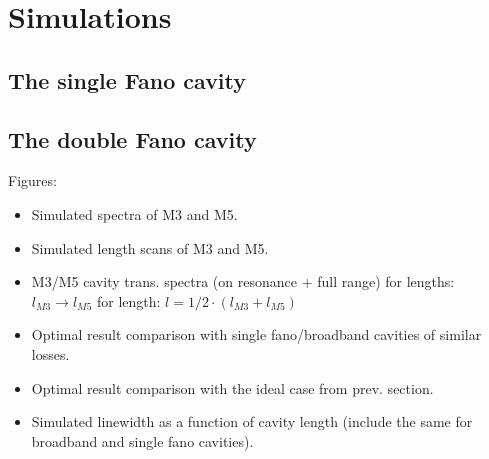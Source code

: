\section{Simulations}

\subsection{The single Fano cavity}

\subsection{The double Fano cavity}

Figures:
\begin{itemize}
    \item Simulated spectra of M3 and M5.
    \item Simulated length scans of M3 and M5.
    \item M3/M5 cavity trans. spectra (on resonance + full range)
    \subitem for lengths: $l_{M3} \rightarrow l_{M5}$
    \subitem for length: $l = 1/2 \cdot (l_{M3} + l_{M5})$
    \item Optimal result comparison with single fano/broadband cavities of similar losses.
    \item Optimal result comparison with the ideal case from prev. section.
    \item Simulated linewidth as a function of cavity length (include the same for broadband and single fano cavities).
\end{itemize}